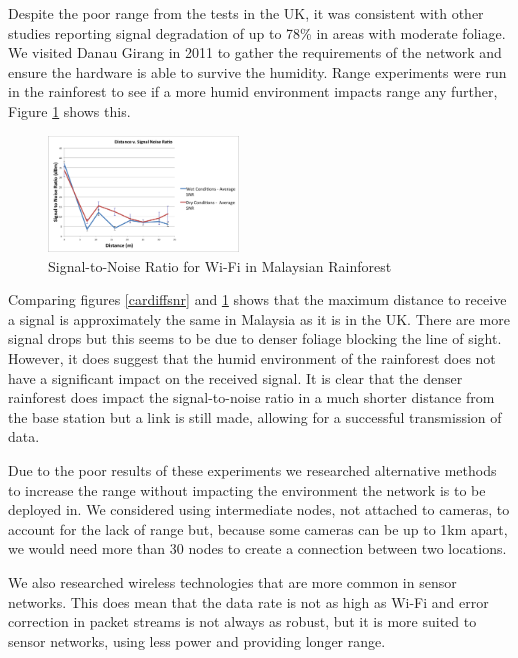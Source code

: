 	Despite the poor range from the tests in the UK, it was consistent with other studies reporting signal degradation of up to 78\% in areas with moderate foliage. We visited Danau Girang in 2011 to gather the requirements of the network and ensure the hardware is able to survive the humidity. Range experiments were run in the rainforest to see if a more humid environment impacts range any further, Figure \ref{malaysiasnr} shows this.
			
			\begin{figure}[!t]
			\centering
			\includegraphics[width=0.45\textwidth]{Chap3/figures/dg_snr.png}
			\caption{Signal-to-Noise Ratio for Wi-Fi in Malaysian Rainforest}
			\label{malaysiasnr}
			\end{figure}
						
			Comparing figures \ref{cardiffsnr} and \ref{malaysiasnr} shows that the maximum distance to receive a signal is approximately the same in Malaysia as it is in the UK.  There are more signal drops but this seems to be due to denser foliage blocking the line of sight. However, it does suggest that the humid environment of the rainforest does not have a significant impact on the received signal. It is clear that the denser rainforest does impact the signal-to-noise ratio in a much shorter distance from the base station but a link is still made, allowing for a successful transmission of data.
			
Due to the poor results of these experiments we researched alternative methods to increase the range without impacting the environment the network is to be deployed in. We considered using intermediate nodes, not attached to cameras, to account for the lack of range but, because some cameras can be up to 1km apart, we would need more than 30 nodes to create a connection between two locations.
			
We also researched wireless technologies that are more common in sensor networks. This does mean that the data rate is not as high as Wi-Fi and error correction in packet streams is not always as robust, but it is more suited to sensor networks, using less power and providing longer range.
			
